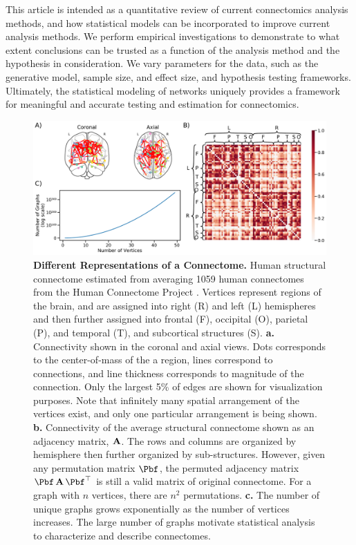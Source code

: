 This article is intended as a quantitative review of current connectomics analysis methods, and how statistical models can be incorporated to improve current analysis methods. We perform empirical investigations to demonstrate to what extent conclusions can be trusted as a function of the analysis method and the hypothesis in consideration. We vary parameters for the data, such as the generative model, sample size, and effect size, and hypothesis testing frameworks. Ultimately, the statistical modeling of networks uniquely provides a framework for meaningful and accurate testing and estimation for connectomics.

\begin{figure}
    \centering
    \includegraphics[width=\textwidth]{figures/dnd/intro}
    \caption{
    \textbf{Different Representations of a Connectome.} 
    Human structural connectome estimated from averaging 1059 human connectomes from the Human Connectome Project \cite{hcp1}.
    Vertices represent regions of the brain, and are assigned into right (R) and left (L) hemispheres and then further assigned into frontal (F), occipital (O), parietal (P), and temporal (T), and subcortical structures (S). 
    \textbf{a.} Connectivity shown in the coronal and axial views. Dots corresponds to the center-of-mass of the a region, lines correspond to connections, and line thickness corresponds to magnitude of the connection. Only the largest 5\% of edges are shown for visualization purposes. Note that infinitely many spatial arrangement of the vertices exist, and only one particular arrangement is being shown.
    \textbf{b.} Connectivity of the average structural connectome shown as an adjacency matrix, $\operatorname{\mathbf{A}}$. The rows and columns are organized by hemisphere then further organized by sub-structures. However, given any permutation matrix $\Pbf$, the permuted adjacency matrix $\Pbf\A\Pbf^\top$ is still a valid matrix of original connectome. For a graph with $n$ vertices, there are $n^2$ permutations.
    \textbf{c.} The number of unique graphs grows exponentially as the number of vertices increases. The large number of graphs motivate statistical analysis to characterize and describe connectomes.
    } 
    \label{fig:intro_fig}
\end{figure} 